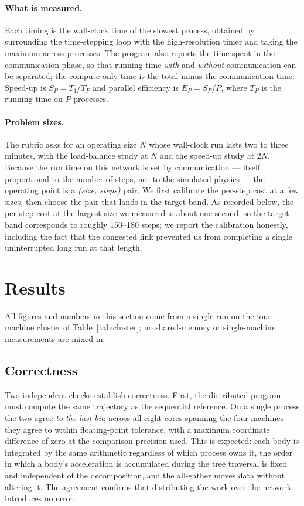 \documentclass[11pt,a4paper]{article}
\begin{document}
\paragraph{What is measured.}
Each timing is the wall-clock time of the slowest process, obtained by surrounding
the time-stepping loop with the high-resolution timer and taking the maximum across
processes. The program also reports the time spent in the communication phase, so
that running time \emph{with} and \emph{without} communication can be separated; the
compute-only time is the total minus the communication time. Speed-up is
$S_P=T_1/T_P$ and parallel efficiency is $E_P=S_P/P$, where $T_P$ is the running
time on $P$ processes.

\paragraph{Problem sizes.}
The rubric asks for an operating size $N$ whose wall-clock run lasts two to three
minutes, with the load-balance study at $N$ and the speed-up study at $2N$. Because
the run time on this network is set by communication --- itself proportional to the
number of steps, not to the simulated physics --- the operating point is a
\emph{(size, steps)} pair. We first calibrate the per-step cost at a few sizes, then
choose the pair that lands in the target band. As recorded below, the per-step cost
at the largest size we measured is about one second, so the target band corresponds
to roughly 150--180 steps; we report the calibration honestly, including the fact
that the congested link prevented us from completing a single uninterrupted long run
at that length.

\section{Results}
\label{sec:results}

All figures and numbers in this section come from a single run on the
four-machine cluster of Table~\ref{tab:cluster}; no shared-memory or
single-machine measurements are mixed in.

\subsection{Correctness}
\label{sec:correctness}

Two independent checks establish correctness. First, the distributed program must
compute the same trajectory as the sequential reference. On a single process the
two agree \emph{to the last bit}; across all eight cores spanning the four machines
they agree to within floating-point tolerance, with a maximum coordinate difference
of zero at the comparison precision used. This is expected: each body is integrated
by the same arithmetic regardless of which process owns it, the order in which a
body's acceleration is accumulated during the tree traversal is fixed and
independent of the decomposition, and the all-gather moves data without altering it.
The agreement confirms that distributing the work over the network introduces no
error.
\end{document}
